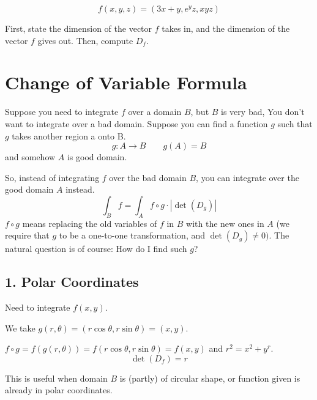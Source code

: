 \begin{exercise}
    $$f(x, y, z) = (3x + y, e^yz, xyz)$$

    First, state the dimension of the vector $f$ takes in, and the dimension of the vector $f$ gives out. Then, compute $D_f$.
\end{exercise}

\section{Change of Variable Formula}

Suppose you need to integrate $f$ over a domain $B$, but $B$ is very bad, You don't want to integrate over a bad domain. Suppose you can find a function $g$ such that $g$ takes another region a onto B. $$g: A \to B \qquad g(A) = B$$ and somehow $A$ is good domain. 

So, instead of integrating $f$ over the bad domain $B$, you can integrate over the good domain $A$ instead. $$\int_B f = \int_A f \circ g \cdot \left| \det(D_g) \right|$$ $f \circ g$ means replacing the old variables of $f$ in $B$ with the new ones in $A$ (we require that $g$ to be a one-to-one transformation, and $\det(D_g) \neq 0)$. The natural question is of course: How do I find such $g$?

\subsection*{1. Polar Coordinates}

Need to integrate $f(x, y)$. 

We take $g(r,\theta) = (r\cos{\theta},r\sin{\theta}) = (x,y)$. 

$f \circ g = f(g(r, \theta)) = f(r\cos{\theta}, r\sin{\theta}) = f(x, y)$ and $r^2 = x^2 + y^r$. 
$$\det(D_f) = r$$

This is useful when domain $B$ is (partly) of circular shape, or function given is already in polar coordinates.

